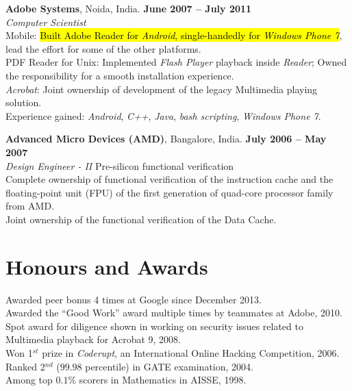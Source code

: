 \documentclass[margin,line]{resume}
\begin{document}
\begin{resume}
	\textbf{Adobe Systems}, Noida, India. \hfill \textbf{June 2007 -- July 2011}\vspace{2mm}\\\vspace{1mm}%
	\textsl{Computer Scientist}\\
	Mobile: \hl{Built Adobe Reader for \textit{Android}, single-handedly for \textit{Windows Phone 7}}, lead the effort for some of the other platforms.\\
	PDF Reader for Unix: Implemented \textit{Flash Player} playback inside \textit{Reader}; Owned the responsibility for a smooth installation experience.\\
	\textit{Acrobat}: Joint ownership of development of the legacy Multimedia playing solution.\\
	Experience gained: \textit{Android}, \textit{C++}, \textit{Java}, \textit{bash scripting}, \textit{Windows Phone 7}.

	\textbf{Advanced Micro Devices (AMD)}, Bangalore, India. \hfill \textbf{July 2006 -- May 2007}\vspace{2mm}\\\vspace{1mm}%
	\textsl{Design Engineer - II} \hfill Pre-silicon functional verification\\
	Complete ownership of functional verification of the instruction cache and the floating-point unit (FPU) of the first generation of quad-core processor family from AMD.\\
	Joint ownership of the functional verification of the Data Cache.\\

	\vfill \break

	\section{\mysidestyle Honours and Awards}

	Awarded peer bonus 4 times at Google since December 2013.  \vspace{1mm}\\%
	Awarded the ``Good Work'' award multiple times by teammates at Adobe, 2010.  \vspace{1mm}\\%
	Spot award for diligence shown in working on security issues related to Multimedia playback for Acrobat 9, 2008.  \vspace{1mm}\\%
	Won 1$^{st}$ prize in \textit{Coderupt}, an International Online Hacking Competition, 2006.  \vspace{1mm}\\%
	Ranked 2$^{nd}$ ($99.98$ percentile) in GATE examination, 2004.  \vspace{1mm}\\%
	Among top $0.1\%$ scorers in Mathematics in AISSE, 1998.


\end{resume}
\end{document}
